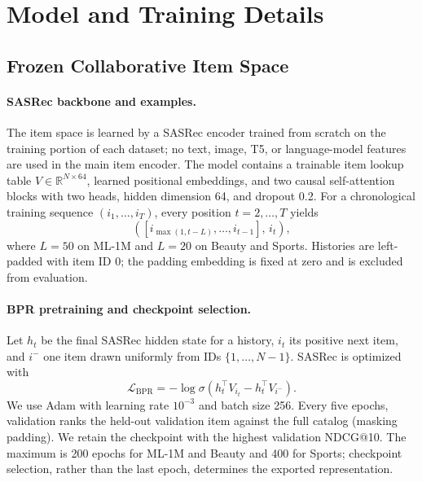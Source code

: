 \documentclass[preprint,12pt]{elsarticle}
\begin{document}
\section{Model and Training Details}
\label{app:training}

\subsection{Frozen Collaborative Item Space}
\label{app:item-encoder}

\paragraph{SASRec backbone and examples.}
The item space is learned by a SASRec encoder trained from scratch on the
training portion of each dataset; no text, image, T5, or language-model
features are used in the main item encoder.  The model contains a trainable
item lookup table \(V\in\mathbb{R}^{N\times64}\), learned positional
embeddings, and two causal self-attention blocks with two heads, hidden
dimension 64, and dropout 0.2.  For a chronological training sequence
\((i_1,\ldots,i_T)\), every position \(t=2,\ldots,T\) yields
\[
  ([i_{\max(1,t-L)},\ldots,i_{t-1}],\,i_t),
\]
where \(L=50\) on ML-1M and \(L=20\) on Beauty and Sports.  Histories are
left-padded with item ID 0; the padding embedding is fixed at zero and is
excluded from evaluation.

\paragraph{BPR pretraining and checkpoint selection.}
Let \(h_t\) be the final SASRec hidden state for a history, \(i_t\) its
positive next item, and \(i^-\) one item drawn uniformly from IDs
\(\{1,\ldots,N-1\}\).  SASRec is optimized with
\[
  \mathcal L_{\mathrm{BPR}}
  =-\log\sigma(h_t^\top V_{i_t}-h_t^\top V_{i^-}).
\]
We use Adam with learning rate \(10^{-3}\) and batch size 256.  Every five
epochs, validation ranks the held-out validation item against the full
catalog (masking padding).  We retain the checkpoint with the highest
validation NDCG@10.  The maximum is 200 epochs for ML-1M and Beauty and 400
for Sports; checkpoint selection, rather than the last epoch, determines the
exported representation.
\end{document}
